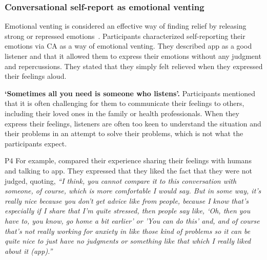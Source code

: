     \subsubsection{Conversational self-report as emotional venting}\label{sec:emotional_venting}
    Emotional venting is considered an effective way of finding relief by releasing strong or repressed emotions~\cite{bennett1991irrationality, tonnaer2020explosive, leslie2008boxing}. 
    Participants characterized self-reporting their emotions via \ac{CA} as a way of emotional venting. 
    They described \acl{app} as a good listener and that it allowed them to express their emotions without any judgment and repercussions.
    They stated that they simply felt relieved when they expressed their feelings aloud.
    



        \textbf{`Sometimes all you need is someone who listens'. }
        Participants mentioned that it is often challenging for them to communicate their feelings to others, including their loved ones in the family or health professionals. When they express their feelings, listeners are often too keen to understand the situation and their problems in an attempt to solve their problems, which is not what the participants expect.
        
            P4 For example, compared their experience sharing their feelings with humans and talking to \acl{app}. They expressed that they liked the fact that they were not judged, quoting,
                \textit{``I think, you cannot compare it to this conversation with someone, of course, which is more comfortable I would say. But in some way, it's really nice because you don't get advice like from people, because I know that's especially if I share that I'm quite stressed, then people say like, `Oh, then you have to, you know, go home a bit earlier' or 'You can do this' and, and of course that's not really working for anxiety in like those kind of problems so it can be quite nice to just have no judgments or something like that which I really liked about it (\acl{app}).''}
            
